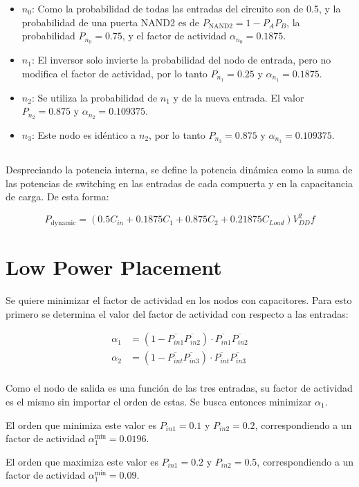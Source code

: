 \documentclass[letterpaper, 12pt]{article}
\numberwithin{equation}{section}
\begin{document}
\begin{itemize}
  \item \(n_0\): Como la probabilidad de todas las entradas del circuito son de 0.5, y la probabilidad de una puerta NAND2 es de \(P_{\text{NAND2}} = 1-P_AP_B\), la probabilidad \(P_{n_0} = 0.75\), y el factor de actividad \(\alpha_{n_0} = 0.1875\).

  \item \(n_1\): El inversor solo invierte la probabilidad del nodo de entrada, pero no modifica el factor de actividad, por lo tanto \(P_{n_1} = 0.25\) y \(\alpha_{n_1} = 0.1875\).

  \item \(n_2\): Se utiliza la probabilidad de \(n_1\) y de la nueva entrada. El valor \(P_{n_2} = 0.875\) y \(\alpha_{n_2} = 0.109375\).

  \item \(n_3\): Este nodo es idéntico a \(n_2\), por lo tanto \(P_{n_3} = 0.875\) y \(\alpha_{n_3} = 0.109375\).
\end{itemize}

\subsection{}

Despreciando la potencia interna, se define la potencia dinámica como la suma de las potencias de switching en las entradas de cada compuerta y en la capacitancia de carga. De esta forma:

\begin{equation}
  P_{\text{dynamic}} = \left( 0.5 C_{in} + 0.1875 C_{1} + 0.875 C_2 + 0.21875 C_{Load}\right) V_{DD}^2 f
\end{equation}

\section{Low Power Placement}

Se quiere minimizar el factor de actividad en los nodos con capacitores. Para esto primero se determina el valor del factor de actividad con respecto a las entradas:

\begin{align}
  \alpha_{1} &= (1-\overline{P_{in1}}\overline{P_{in2}})\cdot \overline{P_{in1}}\overline{P_{in2}} \\
  \alpha_{2} &= (1-\overline{P_{int}}\overline{P_{in3}})\cdot \overline{P_{int}}\overline{P_{in3}} \\
\end{align}

Como el nodo de salida es una función de las tres entradas, su factor de actividad es el mismo sin importar el orden de estas. Se busca entonces minimizar \(\alpha_1\).

El orden que minimiza este valor es \(P_{in1} = 0.1\) y \(P_{in2} = 0.2\), correspondiendo a un factor de actividad \(\alpha_{1}^{\text{min}} = 0.0196 \).

El orden que maximiza este valor es \(P_{in1} = 0.2\) y \(P_{in2} = 0.5\), correspondiendo a un factor de actividad \(\alpha_{1}^{\text{min}} = 0.09 \).
\end{document}
